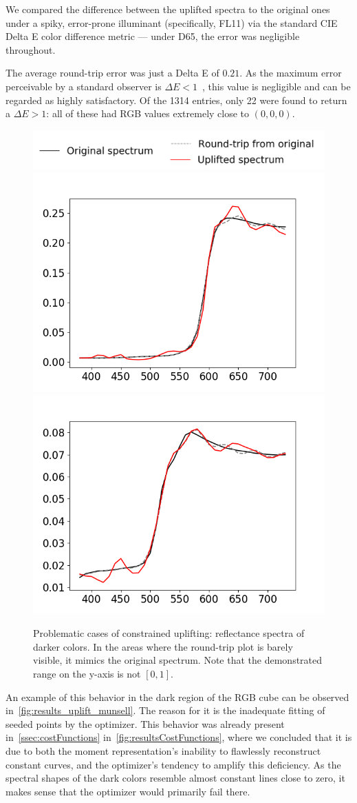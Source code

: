 We compared the difference between the uplifted spectra to the original ones under a spiky, error-prone illuminant (specifically, FL11) via the standard CIE Delta E color difference metric --- under D65, the error was negligible throughout.

The average round-trip error was just a Delta E of $0.21$. As the maximum error perceivable by a standard observer is $\Delta E<1$~\cite{maxColorDifference}, this value is negligible and can be regarded as highly satisfactory. Of the 1314 entries, only 22 were found to return a $\Delta E > 1$: all of these had RGB values extremely close to $(0,0,0)$. 

\begin{figure}[t!]
	\centering
	\includegraphics[width=0.6\linewidth]{img/seeding_accuracy_legend.png}
	\includegraphics[width=0.45\linewidth]{img/seeding_accuracy_dark_12coef.png}
	\includegraphics[width=0.45\linewidth]{img/seeding_accuracy_dark_14coef.png}
	\caption{Problematic cases of constrained uplifting: reflectance spectra of darker colors. In the areas where the round-trip plot is barely visible, it mimics the original spectrum. Note that the demonstrated range on the y-axis is not $[0,1]$.}
	\label{fig:seeding_accuracy_dark}
\end{figure}

An example of this behavior in the dark region of the RGB cube can be observed in~\cref{fig:results_uplift_munsell}. The reason for it is the inadequate fitting of seeded points by the optimizer. This behavior was already present in~\cref{ssec:costFunctions} in~\cref{fig:resultsCostFunctions}, where we concluded that it is due to both the moment representation's inability to flawlessly reconstruct constant curves, and the optimizer's tendency to amplify this deficiency. As the spectral shapes of the dark colors resemble almost constant lines close to zero, it makes sense that the optimizer would primarily fail there.


